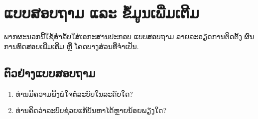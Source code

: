 \chapter{ແບບສອບຖາມ ແລະ ຂໍ້ມູນເພີ່ມເຕີມ}

ພາກຜະນວກນີ້ໃຊ້ສຳລັບໃສ່ເອກະສານປະກອບ ແບບສອບຖາມ ລາຍລະອຽດການຕິດຕັ້ງ ຜົນການທົດສອບເພີ່ມເຕີມ ຫຼື ໂຄດບາງສ່ວນທີ່ຈຳເປັນ.

\section{ຕົວຢ່າງແບບສອບຖາມ}
\begin{enumerate}
  \item ທ່ານມີຄວາມພຶງພໍໃຈຕໍ່ລະບົບໃນລະດັບໃດ?
  \item ທ່ານຄິດວ່າລະບົບຊ່ວຍແກ້ບັນຫາໄດ້ຫຼາຍນ້ອຍພຽງໃດ?
\end{enumerate}
